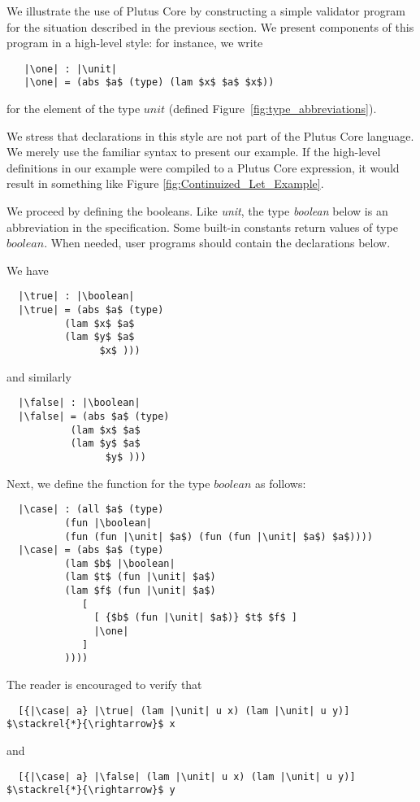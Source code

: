 \documentclass[../plutus-core-specification.tex]{subfiles}
\begin{document}
We illustrate the use of Plutus Core by constructing a simple
validator program for the situation described in the previous
section. We present components of this program in a high-level style:
for instance, we write
\begin{lstlisting}
   |\one| : |\unit|
   |\one| = (abs $a$ (type) (lam $x$ $a$ $x$))
\end{lstlisting}
for the element of the type $unit$ (defined Figure~\ref{fig:type_abbreviations}).

We stress that declarations in this style are not part of the Plutus
Core language. We merely use the familiar syntax to present our
example. If the high-level definitions in our example were compiled to
a Plutus Core expression, it would result in something like Figure
\ref{fig:Continuized_Let_Example}.

We proceed by defining the booleans. Like \textit{unit}, the type \textit{boolean}
below is an abbreviation in the specification. Some built-in constants
return values of type $boolean$. When needed, user programs should
contain the declarations below.


\noindent We have

\begin{lstlisting}
  |\true| : |\boolean|
  |\true| = (abs $a$ (type)
          (lam $x$ $a$
          (lam $y$ $a$
                $x$ )))
\end{lstlisting}
and similarly
\begin{lstlisting}
  |\false| : |\boolean|
  |\false| = (abs $a$ (type)
           (lam $x$ $a$
           (lam $y$ $a$
                 $y$ )))
\end{lstlisting}

\noindent Next, we define the \case{} function for the type $boolean$ as follows:
\begin{lstlisting}
  |\case| : (all $a$ (type)
          (fun |\boolean|
          (fun (fun |\unit| $a$) (fun (fun |\unit| $a$) $a$))))
  |\case| = (abs $a$ (type)
          (lam $b$ |\boolean|
          (lam $t$ (fun |\unit| $a$)
          (lam $f$ (fun |\unit| $a$)
             [
               [ {$b$ (fun |\unit| $a$)} $t$ $f$ ]
               |\one|
             ]
          ))))
\end{lstlisting}
The reader is encouraged to verify that
\begin{lstlisting}
  [{|\case| a} |\true| (lam |\unit| u x) (lam |\unit| u y)] $\stackrel{*}{\rightarrow}$ x
\end{lstlisting}
and
\begin{lstlisting}
  [{|\case| a} |\false| (lam |\unit| u x) (lam |\unit| u y)] $\stackrel{*}{\rightarrow}$ y
\end{lstlisting}
\end{document}
